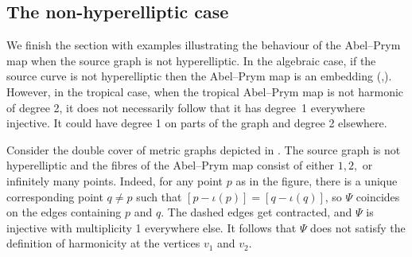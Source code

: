 \subsection{The non-hyperelliptic case}
We finish the section with   examples  illustrating the behaviour of the Abel--Prym map when the source graph is not hyperelliptic. 
In the algebraic case, if the source curve is not hyperelliptic then the Abel--Prym map is an embedding (\cite{BL04},\cite{LZ22}).
However, in the tropical case, when the tropical Abel--Prym map is not harmonic of degree 2, it does not necessarily follow that it has degree~1 everywhere injective. It could have degree 1 on parts of the graph and degree 2 elsewhere.

\begin{exam}\label{ex:hyperellipticType}
Consider the double cover of metric graphs depicted in . The source graph is not hyperelliptic and the fibres of the Abel--Prym map consist of either  $1,2,$ or infinitely many points. Indeed, for any point $p$ as in the figure, there is a unique corresponding point $q\neq p$ such that $[p-\iota(p)] = [q-\iota(q)]$, so $\Psi$ coincides on the edges containing $p$ and $q$. The dashed edges get contracted, and $\Psi$ is injective with multiplicity 1 everywhere else. It follows that $\Psi$ does not satisfy the definition of harmonicity at the vertices $v_1$ and $v_2$.  

 
    \begin{figure}[ht]
    \centering
{}
\end{figure}
\end{exam}
